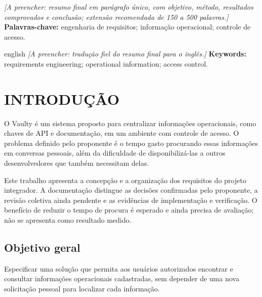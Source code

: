 \documentclass[12pt,oneside,openany,a4paper,english,brazil]{abntex2}
\newcommand{\pendente}[1]{\textit{[A preencher: #1.]}}
\begin{document}
\begin{resumo}
  \noindent\pendente{resumo final em parágrafo único, com objetivo,
  método, resultados comprovados e conclusão; extensão recomendada
  de 150 a 500 palavras}
  \vspace{\baselineskip}
  \noindent\textbf{Palavras-chave:} engenharia de requisitos;
  informação operacional; controle de acesso.
\end{resumo}

\begin{resumo}[Abstract]
  \begin{otherlanguage*}{english}
    \noindent\pendente{tradução fiel do resumo final para o inglês}
    \vspace{\baselineskip}
    \noindent\textbf{Keywords:} requirements engineering;
    operational information; access control.
  \end{otherlanguage*}
\end{resumo}

\tableofcontents*\cleardoublepage

\textual
\pagestyle{vaulty}

\chapter{INTRODUÇÃO}
O Vaulty é um sistema proposto para centralizar informações operacionais,
como chaves de API e documentação, em um ambiente com controle de acesso.
O problema definido pelo proponente é o tempo gasto procurando essas
informações em conversas pessoais, além da dificuldade de disponibilizá-las
a outros desenvolvedores que também necessitam delas.

Este trabalho apresenta a concepção e a organização dos requisitos do
projeto integrador. A documentação distingue as decisões confirmadas pelo
proponente, a revisão coletiva ainda pendente e as evidências de implementação
e verificação. O benefício de reduzir o tempo de procura é esperado e ainda
precisa de avaliação; não se apresenta como resultado medido.

\section{Objetivo geral}
Especificar uma solução que permita aos usuários autorizados encontrar e
consultar informações operacionais cadastradas, sem depender de uma nova
solicitação pessoal para localizar cada informação.
\end{document}
